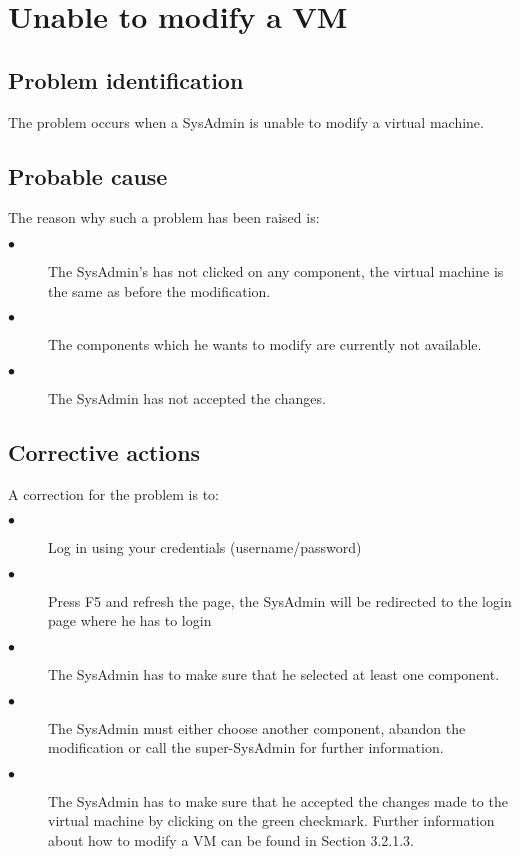 \section{Unable to modify a VM}

\subsection{Problem identification}
The problem occurs when a SysAdmin is unable to modify a virtual
machine.

\subsection{Probable cause}

The reason why such a problem has been raised is:\\
\begin{description}
\item[$\bullet$] The SysAdmin's has not clicked on any component, the virtual
machine is the same as before the modification.
\item[$\bullet$] The components which he wants to modify are currently not
available.
\item[$\bullet$] The SysAdmin has not accepted the changes.
\end{description}


\subsection{Corrective actions}

A correction for the problem is to:\\
\begin{description}
\item[$\bullet$] Log in using your credentials (username/password)
\item[$\bullet$] Press F5 and refresh the page, the SysAdmin will be redirected to
the login page where he has to login
\item[$\bullet$] The SysAdmin has to make sure that he selected at least one
component.
\item[$\bullet$] The SysAdmin must either choose another component, abandon
the modification or call the super-SysAdmin for further information.
\item[$\bullet$] The SysAdmin has to make sure that he accepted the changes made
to the virtual machine by clicking on the green checkmark. Further information about
how to modify a VM can be found in Section 3.2.1.3.
\end{description}






